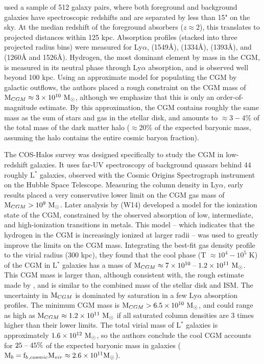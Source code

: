 \citet{Steidel2010} used a sample of 512 galaxy pairs, where both
foreground and background galaxies have spectroscopic redshifts and
are separated by less than 15" on the sky. At the median redshift of
the foreground absorbers ($z\approx 2$), this translates to projected
distances within 125 kpc. Absorption profiles (stacked into three
projected radius bins) were measured for Ly$\alpha$, 
(1549\AA),  (1334\AA),  (1393\AA), and
 (1260\AA{} and 1526\AA). Hydrogen, the most dominant
element by mass in the CGM, is measured in its neutral phase through
Ly$\alpha$ absorption, and is observed well beyond 100 kpc. Using an
approximate model for populating the CGM by galactic outflows, the
authors placed a rough constraint on the CGM mass of $\textrm{M}{}_{CGM}
\approx 3\times 10^{10}~\textrm{M}_\odot{}$, although we emphasize that this is only
an order-of-magnitude estimate. By this approximation, the CGM
contains roughly the same mass as the sum of stars and gas in the
stellar disk, and amounts to $\approx 3-4\%$ of the total mass of the
dark matter halo ($\approx 20\%$ of the expected baryonic mass,
assuming the halo contains the entire cosmic baryon fraction).

The COS-Halos survey \citep{Tumlinson2011} was designed specifically
to study the CGM in low-redshift galaxies. It uses far-UV spectroscopy
of background quasars behind 44 roughly L$^*$ galaxies, observed with
the Cosmic Origins Spectrograph instrument on the Hubble Space
Telescope. Measuring the column density in Ly$\alpha$, early results
\citep{Thom2012,Werk2013} placed a very conservative lower limit on
the CGM gas mass of $\textrm{M}{}_{CGM} > 10^9~\textrm{M}_\odot{}$. Later analysis by
\textbf{\citet{Werk2014}} (W14) developed a model for the ionization
state of the CGM, constrained by the observed absorption of low,
intermediate, and high-ionization transitions in metals. This model --
which indicates that the hydrogen in the CGM is increasingly ionized
at larger radii -- was used to greatly improve the limits on the CGM
mass. Integrating the best-fit gas density profile to the virial
radius (300 kpc), they found that the cool phase (T $\approx 10^4 -
10^5$ K) of the CGM in L$^*$ galaxies has a mass of $\textrm{M}{}_{CGM}
\approx 7\times 10^{10}\;\textrm{--}\;1.2\times 10^{11}~\textrm{M}_\odot{}$. This CGM mass is
larger than, although consistent with, the rough estimate made by
\citet{Steidel2010}, and is similar to the combined mass of the
stellar disk and ISM. The uncertainty in $\textrm{M}{}_{CGM}$ is dominated
by saturation in a few Ly$\alpha$ absorption profiles. The minimum CGM
mass is $\textrm{M}{}_{CGM} > 6.5\times 10^{10} ~\textrm{M}_\odot$, and could range as
high as $\textrm{M}{}_{CGM} \approx 1.2\times 10^{11}~\textrm{M}_\odot{}$ if all saturated
column densities are 3 times higher than their lower limits. The total
virial mass of L$^*$ galaxies is approximately
$1.6\times 10^{12}~\textrm{M}_\odot{}$, so the authors conclude the cool CGM accounts
for $25\;\textrm{--}\;45\%$ of the expected baryonic mass in galaxies
($\textrm{M}{}_{b} = \textrm{f\ensuremath{_b}}{}_{,cosmic} \textrm{M\ensuremath{_{vir}}}{} \approx 2.6\times 10^{11}
\textrm{M}_\odot{}$).

